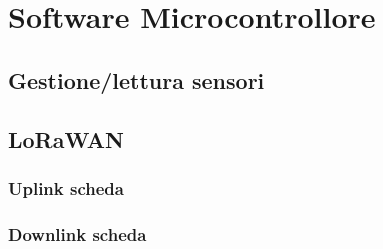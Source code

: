 \section{Software Microcontrollore}

\subsection{Gestione/lettura sensori}


\subsection{LoRaWAN}
  
  \subsubsection{Uplink scheda}


  \subsubsection{Downlink scheda}




